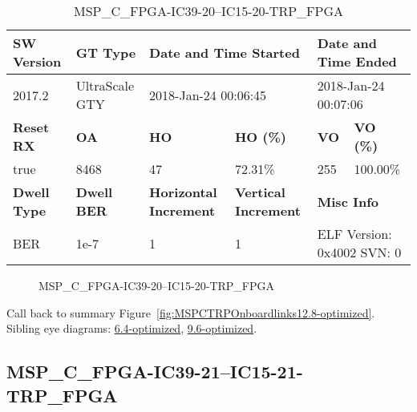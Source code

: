 \begin{table}[h]
\centering
\caption{MSP\_C\_FPGA-IC39-20--IC15-20-TRP\_FPGA}
\label{tab:MSPCFPGAIC3920IC1520TRPFPGA12.8-optimized}
\begin{tabular}{@{}|l|l|l|l|l|l|@{}}
\toprule
\textbf{SW Version}                & \textbf{GT Type}   & \multicolumn{2}{l|}{\textbf{Date and Time Started}}            & \multicolumn{2}{l|}{\textbf{Date and Time Ended}}        \\ \midrule
2017.2                       & UltraScale GTY          & \multicolumn{2}{l|}{2018-Jan-24 00:06:45}                   & \multicolumn{2}{l|}{2018-Jan-24 00:07:06}               \\ \midrule
\textbf{Reset RX}                  & \textbf{OA} & \textbf{HO}   & \textbf{HO (\%)} & \textbf{VO} & \textbf{VO (\%)} \\ \midrule
true & 8468        & 47          & 72.31\%        & 255        & 100.00\%       \\ \midrule
\textbf{Dwell Type}                & \textbf{Dwell BER} & \textbf{Horizontal Increment} & \textbf{Vertical Increment}    & \multicolumn{2}{l|}{\textbf{Misc Info}}                  \\ \midrule
BER                            & 1e-7        & 1        & 1           & \multicolumn{2}{l|}{ELF Version: 0x4002 SVN: 0}                         \\ \bottomrule
\end{tabular}
\end{table}

\begin{figure}[h]
\caption{MSP\_C\_FPGA-IC39-20--IC15-20-TRP\_FPGA} \label{fig:MSPCFPGAIC3920IC1520TRPFPGA12.8-optimized}
\end{figure}

Call back to summary Figure~\ref{fig:MSPCTRPOnboardlinks12.8-optimized}.
Sibling eye diagrams: \hyperref[sec:MSPCFPGAIC3920IC1520TRPFPGA6.4-optimized]{6.4-optimized}, \hyperref[sec:MSPCFPGAIC3920IC1520TRPFPGA9.6-optimized]{9.6-optimized}.

\clearpage
\newpage


\subsection{MSP\_C\_FPGA-IC39-21--IC15-21-TRP\_FPGA}\label{sec:MSPCFPGAIC3921IC1521TRPFPGA12.8-optimized}

